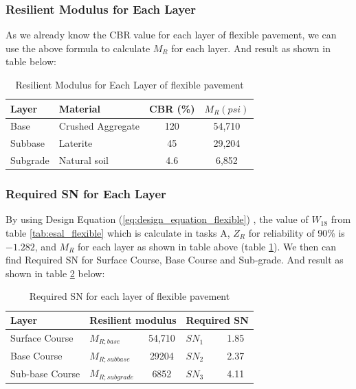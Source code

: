 \subsubsection*{Resilient Modulus for Each Layer}
As we already know the CBR value for each layer of flexible pavement, we can use the above
formula to calculate $M_R$ for each layer. And result as shown in table below:
\begin{table}[H]
\centering
\begin{tabular}{llcc}
\toprule
\textbf{Layer} & \textbf{Material} & \textbf{CBR (\%)} & $M_R(psi)$ \\
\midrule
Base      & Crushed Aggregate & 120 & 54,710 \\
Subbase   & Laterite          & 45  & 29,204 \\
Subgrade  & Natural soil      & 4.6 & 6,852  \\
\bottomrule
\end{tabular}
\caption{Resilient Modulus for Each Layer of flexible pavement}
\label{tab:resilient_modulus}
\end{table}
\subsubsection*{Required SN for Each Layer}
By using Design Equation (\ref{eq:design_equation_flexible}) , the value of $W_{18}$ from table
\ref{tab:esal_flexible} which is calculate in tasks A, $Z_R$ for reliability of 90\% is $-1.282$,
and $M_R$ for each layer as shown in table above (table \ref{tab:resilient_modulus}).
We then can find Required SN for Surface Course, Base Course and Sub-grade. And result as
shown in table \ref{tab:required_sn} below:
\begin{table}[h!]
\centering
\begin{tabular}{|l|l|c|l|c|}
\hline
\textbf{Layer} & \multicolumn{2}{c|}{\textbf{Resilient modulus}} & \multicolumn{2}{c|}{\textbf{Required SN}} \\
\hline
Surface Course   & $M_{R;base}$     & 54,710 & $SN_1$ & 1.85 \\
\hline
Base Course      & $M_{R;subbase}$  & 29204  & $SN_2$ & 2.37 \\
\hline
Sub-base Course  & $M_{R;subgrade}$ & 6852   & $SN_3$ & 4.11 \\
\hline
\end{tabular}
\caption{Required SN for each layer of flexible pavement}
\label{tab:required_sn}
\end{table}
